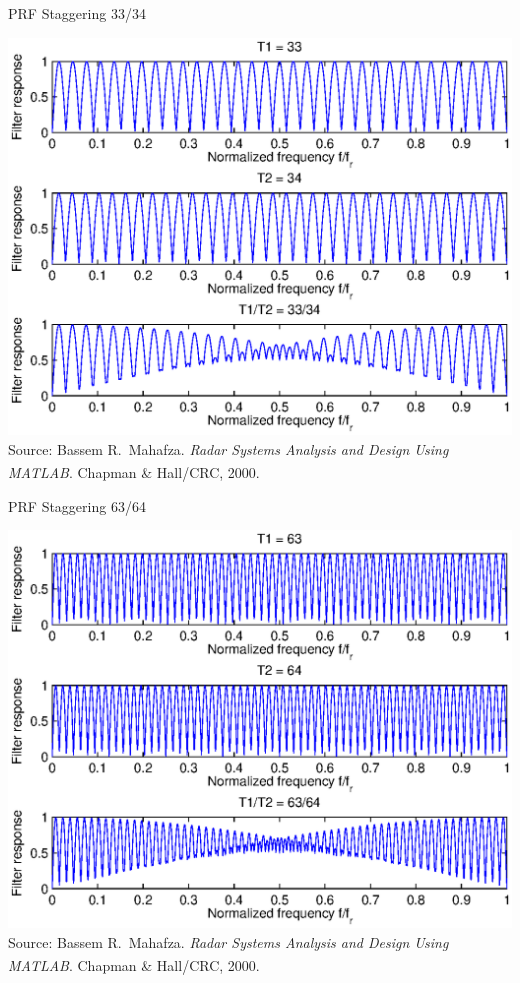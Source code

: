 \documentclass[mathserif]{beamer}
\begin{document}
    
    \begin{frame}{PRF Staggering 33/34}
      \begin{minipage}[t][0.8\textheight][t]{\textwidth}
	\includegraphics[width=\linewidth]{prfStaggering33_34} \\
	\vfill
	\tiny{Source: Bassem R.~Mahafza. \emph{Radar Systems Analysis and Design Using MATLAB\textsuperscript{\textregistered}}. Chapman \& Hall/CRC, 2000.}
      \end{minipage}
    \end{frame}
    
   
    \begin{frame}{PRF Staggering 63/64}
      \begin{minipage}[t][0.8\textheight][t]{\textwidth}
	\includegraphics[width=\linewidth]{prfStaggering63_64} \\
	\vfill
	\tiny{Source: Bassem R.~Mahafza. \emph{Radar Systems Analysis and Design Using MATLAB\textsuperscript{\textregistered}}. Chapman \& Hall/CRC, 2000.}
      \end{minipage}
    \end{frame}
    
\end{document}
